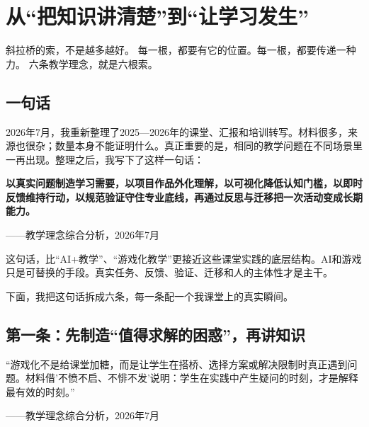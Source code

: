 
\chapter{从``把知识讲清楚''到``让学习发生''}

\vspace{0.5cm}

\begin{center}
{\small\color{muted} 斜拉桥的索，不是越多越好。}
{\small\color{muted} 每一根，都要有它的位置。每一根，都要传递一种力。}
{\small\color{muted} 六条教学理念，就是六根索。}
\end{center}

\vspace{1cm}

\section{一句话}

2026年7月，我重新整理了2025—2026年的课堂、汇报和培训转写。材料很多，来源也很杂；数量本身不能证明什么。真正重要的是，相同的教学问题在不同场景里一再出现。整理之后，我写下了这样一句话：

\begin{shiyu-inline}
\textbf{以真实问题制造学习需要，以项目作品外化理解，以可视化降低认知门槛，以即时反馈维持行动，以规范验证守住专业底线，再通过反思与迁移把一次活动变成长期能力。}

\hfill ——教学理念综合分析，2026年7月
\end{shiyu-inline}

这句话，比``AI+教学''、``游戏化教学''更接近这些课堂实践的底层结构。AI和游戏只是可替换的手段。真实任务、反馈、验证、迁移和人的主体性才是主干。

下面，我把这句话拆成六条，每一条配一个我课堂上的真实瞬间。

\section{第一条：先制造``值得求解的困惑''，再讲知识}

\begin{shiyu-inline}
``游戏化不是给课堂加糖，而是让学生在搭桥、选择方案或解决限制时真正遇到问题。材料借'不愤不启、不悱不发'说明：学生在实践中产生疑问的时刻，才是解释最有效的时刻。''

\hfill ——教学理念综合分析，2026年7月
\end{shiyu-inline}

